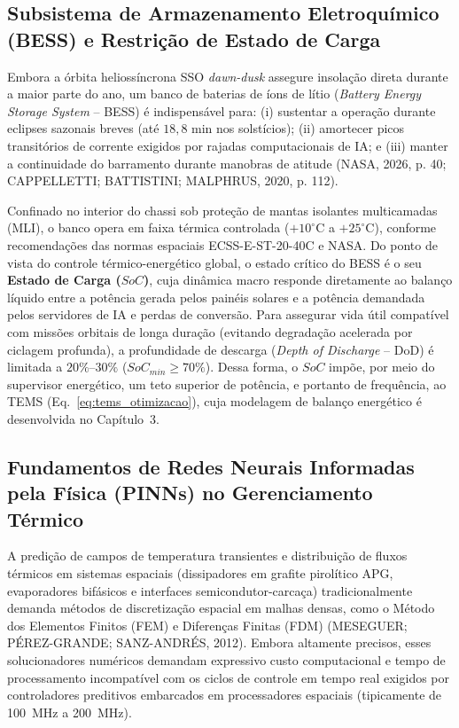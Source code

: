 \subsection{Subsistema de Armazenamento Eletroquímico (BESS) e Restrição de Estado de Carga}
\label{sec:bess_teoria}

Embora a órbita heliossíncrona SSO \textit{dawn-dusk} assegure insolação direta durante a maior parte do ano, um banco de baterias de íons de lítio (\textit{Battery Energy Storage System} -- BESS) é indispensável para: (i) sustentar a operação durante eclipses sazonais breves (até $18{,}8\text{ min}$ nos solstícios); (ii) amortecer picos transitórios de corrente exigidos por rajadas computacionais de IA; e (iii) manter a continuidade do barramento durante manobras de atitude (NASA, 2026, p. 40; CAPPELLETTI; BATTISTINI; MALPHRUS, 2020, p. 112).

Confinado no interior do chassi sob proteção de mantas isolantes multicamadas (MLI), o banco opera em faixa térmica controlada ($+10^\circ\text{C}$ a $+25^\circ\text{C}$), conforme recomendações das normas espaciais ECSS-E-ST-20-40C e NASA. Do ponto de vista do controle térmico-energético global, o estado crítico do BESS é o seu \textbf{Estado de Carga ($SoC$)}, cuja dinâmica macro responde diretamente ao balanço líquido entre a potência gerada pelos painéis solares e a potência demandada pelos servidores de IA e perdas de conversão. Para assegurar vida útil compatível com missões orbitais de longa duração (evitando degradação acelerada por ciclagem profunda), a profundidade de descarga (\textit{Depth of Discharge} -- DoD) é limitada a $20\%\text{--}30\%$ ($SoC_{min} \ge 70\%$). Dessa forma, o $SoC$ impõe, por meio do supervisor energético, um teto superior de potência, e portanto de frequência, ao TEMS (Eq.~\ref{eq:tems_otimizacao}), cuja modelagem de balanço energético é desenvolvida no Capítulo~3.

\subsection{Fundamentos de Redes Neurais Informadas pela Física (PINNs) no Gerenciamento Térmico}
\label{sec:fundamentos_pinn_termico}

A predição de campos de temperatura transientes e distribuição de fluxos térmicos em sistemas espaciais (dissipadores em grafite pirolítico APG, evaporadores bifásicos e interfaces semicondutor-carcaça) tradicionalmente demanda métodos de discretização espacial em malhas densas, como o Método dos Elementos Finitos (FEM) e Diferenças Finitas (FDM) (MESEGUER; PÉREZ-GRANDE; SANZ-ANDRÉS, 2012). Embora altamente precisos, esses solucionadores numéricos demandam expressivo custo computacional e tempo de processamento incompatível com os ciclos de controle em tempo real exigidos por controladores preditivos embarcados em processadores espaciais (tipicamente de 100~MHz a 200~MHz).

